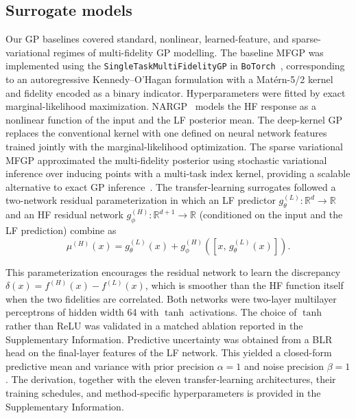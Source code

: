 \documentclass[11pt,a4paper]{article}%
\begin{document}
\subsection{Surrogate models}\label{sec:meth-surrogates}

Our GP baselines covered standard, nonlinear, learned-feature, and
sparse-variational regimes of multi-fidelity GP modelling. The baseline MFGP was implemented using the
\texttt{SingleTaskMultiFidelityGP} in \texttt{BoTorch}~\citep{balandat2020botorch}, corresponding to an
autoregressive Kennedy--O'Hagan formulation with a Mat\'{e}rn-5/2 kernel and fidelity
encoded as a binary indicator. Hyperparameters were fitted by exact
marginal-likelihood maximization. NARGP~\citep{perdikaris2017nonlinear} models the
HF response as a nonlinear function of the input and the LF posterior
mean. The deep-kernel GP~\citep{wilson2016deep} replaces the conventional kernel with one
defined on neural network features trained jointly with the marginal-likelihood optimization. The sparse
variational MFGP approximated the multi-fidelity posterior using stochastic variational
inference over inducing points with a multi-task index kernel, providing a scalable alternative to
exact GP inference~\citep{titsias2009variational, hensman2013gaussian}. The transfer-learning surrogates followed a two-network residual parameterization
in which an LF predictor $g_{\theta}^{(L)}:\mathbb{R}^d\to\mathbb{R}$ and an
HF residual network $g_{\phi}^{(H)}:\mathbb{R}^{d+1}\to\mathbb{R}$ (conditioned
on the input and the LF prediction) combine as
\begin{equation}\label{eq:residual}
\mu^{(H)}(x) = g_{\theta}^{(L)}(x) + g_{\phi}^{(H)}\!\left([x,\, g_{\theta}^{(L)}(x)]\right).
\end{equation}

This parameterization encourages the residual network to learn the discrepancy $\delta(x) = f^{(H)}(x) - f^{(L)}(x)$,
which is smoother than the HF function itself when the two fidelities are
correlated. Both networks were two-layer multilayer perceptrons of hidden width 64 with
$\tanh$ activations. The choice of $\tanh$ rather than ReLU was validated in a matched ablation
reported in the Supplementary Information. Predictive uncertainty was obtained from a BLR head on the final-layer features of the
LF network. This yielded a closed-form predictive mean and
variance with prior precision $\alpha = 1$ and noise precision $\beta = 1$. The 
derivation, together with the eleven transfer-learning
architectures, their training schedules, and method-specific hyperparameters is provided
in the Supplementary Information.
\end{document}
